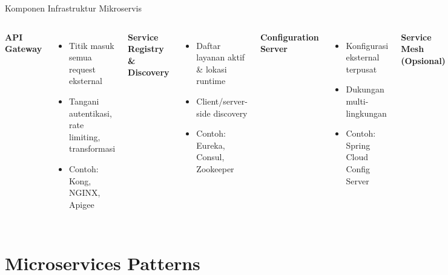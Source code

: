 \documentclass[aspectratio=169, table]{beamer}
\begin{document}
\begin{frame}[fragile]{Komponen Infrastruktur Mikroservis}
	\vspace{20pt}
	\begin{columns}[T]
		\textbf{API Gateway}
		\begin{itemize}
			\item Titik masuk semua request eksternal
			\item Tangani autentikasi, rate limiting, transformasi
			\item Contoh: Kong, NGINX, Apigee
		\end{itemize}
		
		\textbf{Service Registry \& Discovery}
		\begin{itemize}
			\item Daftar layanan aktif \& lokasi runtime
			\item Client/server-side discovery
			\item Contoh: Eureka, Consul, Zookeeper
		\end{itemize}
		
		\textbf{Configuration Server}
		\begin{itemize}
			\item Konfigurasi eksternal terpusat
			\item Dukungan multi-lingkungan
			\item Contoh: Spring Cloud Config Server
		\end{itemize}
		
		\textbf{Service Mesh (Opsional)}
		\begin{itemize}
			\item Kelola komunikasi via sidecar proxy
			\item Observabilitas, TLS, retry, circuit breaking
			\item Contoh: Istio, Linkerd, Kuma
		\end{itemize}
	\end{columns}
\end{frame}

\section{Microservices Patterns}
\end{document}
